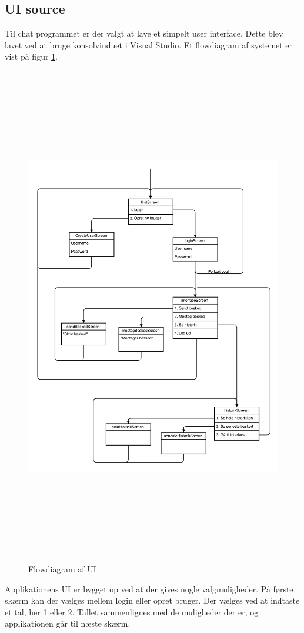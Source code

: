 \subsection{UI source}
Til chat programmet er der valgt at lave et simpelt user interface. Dette blev lavet ved at bruge konsolvinduet i Visual Studio. Et flowdiagram af systemet er vist på figur \ref{fig:uiflow}.
\begin{figure}[ht]
	\centering
	\includegraphics[width=12cm,height=22cm,keepaspectratio]{pictures/UIflow.png}
	\caption{Flowdiagram af UI}
	\label{fig:uiflow}
\end{figure}
Applikationens UI er bygget op ved at der gives nogle valgmuligheder. På første skærm kan der vælges mellem login eller opret bruger. Der vælges ved at indtaste et tal, her 1 eller 2. Tallet sammenlignes med de muligheder der er, og applikationen går til næste skærm.
